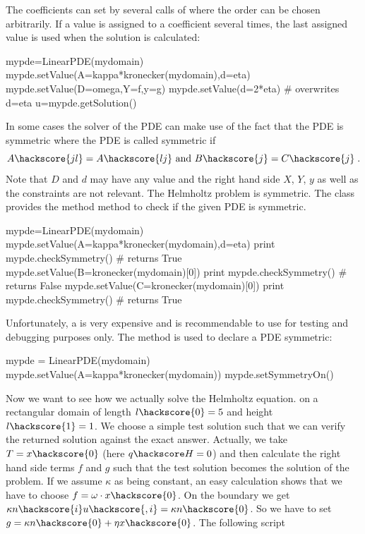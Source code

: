 The coefficients can set by several calls of  where the order can be chosen arbitrarily. 
If a value is assigned to a coefficient several times, the last assigned value is used when
the solution is calculated:
\begin{python}
mypde=LinearPDE(mydomain)
mypde.setValue(A=kappa*kronecker(mydomain),d=eta)
mypde.setValue(D=omega,Y=f,y=g)
mypde.setValue(d=2*eta) # overwrites d=eta
u=mypde.getSolution()
\end{python}
In some cases the solver of the PDE can make use of the fact that the PDE is symmetric where the 
PDE is called symmetric if 
\begin{equation}\label{LINEARPDE.SINGLE.4}
A\hackscore{jl}=A\hackscore{lj} \mbox{ and } B\hackscore{j}=C\hackscore{j} \;.
\end{equation}
Note that $D$ and $d$ may have any value and the right hand side $X$, $Y$, $y$ as well as the constraints
are not relevant. The Helmholtz problem is symmetric. 
The \LinearPDE class provides the method  method to check if the given PDE is symmetric. 
\begin{python}
mypde=LinearPDE(mydomain)
mypde.setValue(A=kappa*kronecker(mydomain),d=eta)
print mypde.checkSymmetry() # returns True
mypde.setValue(B=kronecker(mydomain)[0])
print mypde.checkSymmetry() # returns False
mypde.setValue(C=kronecker(mydomain)[0])
print mypde.checkSymmetry() # returns True
\end{python}
Unfortunately, a  is very expensive and is recommendable to use for
testing and debugging purposes only. The  method is used to
declare a PDE symmetric:
\begin{python}
mypde = LinearPDE(mydomain)
mypde.setValue(A=kappa*kronecker(mydomain))
mypde.setSymmetryOn()
\end{python}
Now we want to see how we actually solve the Helmholtz equation.
on a rectangular domain
of length $l\hackscore{0}=5$ and height $l\hackscore{1}=1$. We choose a simple test solution such that we 
can verify the returned solution against the exact answer. Actually, we 
take $T=x\hackscore{0}$ (here $q\hackscore H = 0$) and then calculate the right hand side terms $f$ and $g$ such that
the test solution becomes the solution of the problem. If we assume $\kappa$ as being constant, 
an easy calculation shows that we have to choose $f=\omega \cdot x\hackscore{0}$. On the boundary we get
$\kappa n\hackscore{i} u\hackscore{,i}=\kappa n\hackscore{0}$.  
So we have to set $g=\kappa n\hackscore{0}+\eta x\hackscore{0}$. The following script  
